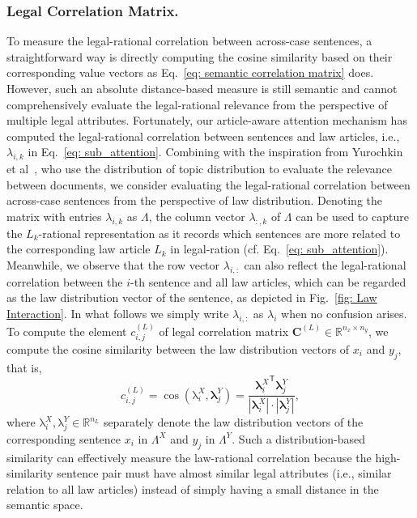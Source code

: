 \subsubsection{Legal Correlation Matrix.} \label{subsubsec: law correlation matrix}
To measure the legal-rational correlation between across-case sentences, a straightforward way is directly computing the cosine similarity based on their corresponding value vectors as Eq.~\ref{eq: semantic correlation matrix} does.
However, such an absolute distance-based measure is still semantic and cannot comprehensively evaluate the legal-rational relevance from the perspective of multiple legal attributes.
Fortunately, our article-aware attention mechanism has computed the legal-rational correlation between sentences and law articles, i.e., 
$\lambda_{i, k}$ in Eq.~\ref{eq: sub_attention}.
Combining with the inspiration from Yurochkin et al~\cite{yurochkin2019topicdistribution}, who use the distribution of topic distribution to evaluate the relevance between documents, we consider evaluating the legal-rational correlation between across-case sentences from the perspective of law distribution.
Denoting the matrix with entries $\lambda_{i, k}$ as $\Lambda$,
the column vector $\lambda_{:, k}$ of $\Lambda$ can be used to capture the $L_k$-rational representation as it records which sentences are more related to the corresponding law article $L_k$ in legal-ration (cf. Eq.~\ref{eq: sub_attention}).
Meanwhile, we observe that the row vector $\lambda_{i, :}$ can also reflect the legal-rational correlation between the $i$-th sentence and all law articles, which can be regarded as the law distribution vector of the sentence, as depicted in Fig.~\ref{fig: Law Interaction}.
In what follows we simply write $\lambda_{i, :}$ as $\lambda_{i}$ when no confusion arises.
To compute the element $c_{i,j}^{(L)}$ of legal correlation matrix $\mathbf{C}^{(L)} \in \mathbb{R}^{n_x \times n_y}$, we compute the cosine similarity between the law distribution vectors of $x_i$ and $y_j$, that is,
\[
c_{i,j}^{(L)} = \cos(\mathrm{\lambda}_{i}^{X}, \mathbf{\lambda}_{j}^{Y}) = 
 \frac{{\mathbf{\lambda}_{i}^{X}}^\mathsf{T} \mathbf{\lambda}_{j}^{Y}}
 { |\mathbf{\lambda}_{i}^{X}| \cdot |\mathbf{\lambda}_{j}^{Y}|},
\]
where $\mathrm{\lambda}_{i}^{X}, \mathrm{\lambda}_{j}^{Y} \in \mathbb{R}^{n_L}$ separately denote the law distribution vectors of the corresponding sentence $x_i$ in $\Lambda^{X} $ and $y_j$ in $\Lambda^{Y}$.
Such a distribution-based similarity can effectively measure the law-rational correlation because the high-similarity sentence pair must have almost similar legal attributes (i.e., similar relation to all law articles) instead of simply having a small distance in the semantic space.

